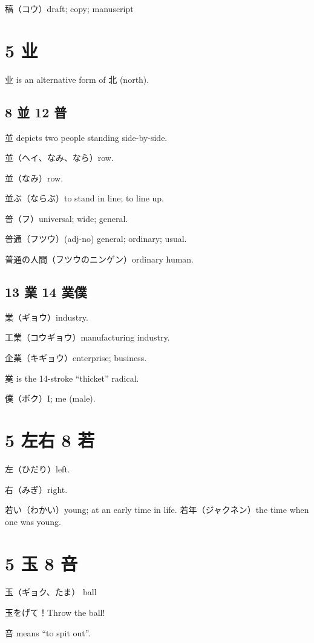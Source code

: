 稿（コウ）draft; copy; manuscript

\section{5 业}

业 is an alternative form of 北 (north).

\subsection{8 並 12 普}

並 depicts two people standing side-by-side.

並（ヘイ、なみ、なら）row.

並（なみ）row.

並ぶ（ならぶ）to stand in line; to line up.

普（フ）universal; wide; general.

普通（フツウ）(adj-no) general; ordinary; usual.

普通の人間（フツウのニンゲン）ordinary human.

\subsection{13 業 14 菐僕}

業（ギョウ）industry.

工業（コウギョウ）manufacturing industry.

企業（キギョウ）enterprise; business.

菐 is the 14-stroke ``thicket'' radical.

僕（ボク）I; me (male).

\section{5 左右 8 若}

左（ひだり）left.

右（みぎ）right.

若い（わかい）young; at an early time in life.
若年（ジャクネン）the time when one was young.

\section{5 玉 8 咅}

玉（ギョク、たま） ball

玉をげて！Throw the ball!

咅 means ``to spit out''.

